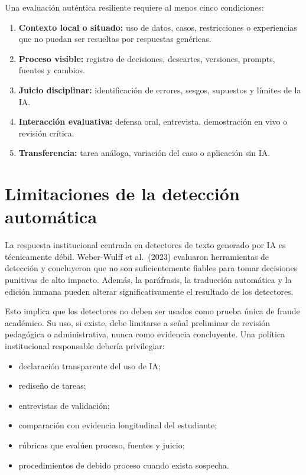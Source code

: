 \documentclass[
  spanish,
  letterpaper,
  DIV=11,
  numbers=noendperiod]{scrartcl}
\providecommand{\tightlist}{%
  \setlength{\itemsep}{0pt}\setlength{\parskip}{0pt}}
\begin{document}
Una evaluación auténtica resiliente requiere al menos cinco condiciones:

\begin{enumerate}
\def\labelenumi{\arabic{enumi}.}
\tightlist
\item
  \textbf{Contexto local o situado:} uso de datos, casos, restricciones
  o experiencias que no puedan ser resueltas por respuestas genéricas.
\item
  \textbf{Proceso visible:} registro de decisiones, descartes,
  versiones, prompts, fuentes y cambios.
\item
  \textbf{Juicio disciplinar:} identificación de errores, sesgos,
  supuestos y límites de la IA.
\item
  \textbf{Interacción evaluativa:} defensa oral, entrevista,
  demostración en vivo o revisión crítica.
\item
  \textbf{Transferencia:} tarea análoga, variación del caso o aplicación
  sin IA.
\end{enumerate}

\section{Limitaciones de la detección
automática}\label{limitaciones-de-la-detecciuxf3n-automuxe1tica}

La respuesta institucional centrada en detectores de texto generado por
IA es técnicamente débil. Weber-Wulff et al.~(2023) evaluaron
herramientas de detección y concluyeron que no son suficientemente
fiables para tomar decisiones punitivas de alto impacto. Además, la
paráfrasis, la traducción automática y la edición humana pueden alterar
significativamente el resultado de los detectores.

Esto implica que los detectores no deben ser usados como prueba única de
fraude académico. Su uso, si existe, debe limitarse a señal preliminar
de revisión pedagógica o administrativa, nunca como evidencia
concluyente. Una política institucional responsable debería privilegiar:

\begin{itemize}
\tightlist
\item
  declaración transparente del uso de IA;
\item
  rediseño de tareas;
\item
  entrevistas de validación;
\item
  comparación con evidencia longitudinal del estudiante;
\item
  rúbricas que evalúen proceso, fuentes y juicio;
\item
  procedimientos de debido proceso cuando exista sospecha.
\end{itemize}
\end{document}
